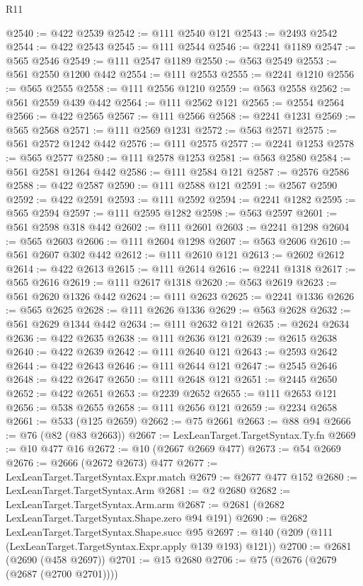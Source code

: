 \begin{lexlean}{R11}
\begin{coremodule}
@2540 := @422 @2539
@2542 := @111 @2540 @121
@2543 := @2493 @2542
@2544 := @422 @2543
@2545 := @111 @2544
@2546 := @2241 @1189
@2547 := @565 @2546
@2549 := @111 @2547 @1189
@2550 := @563 @2549
@2553 := @561 @2550 @1200 @442
@2554 := @111 @2553
@2555 := @2241 @1210
@2556 := @565 @2555
@2558 := @111 @2556 @1210
@2559 := @563 @2558
@2562 := @561 @2559 @439 @442
@2564 := @111 @2562 @121
@2565 := @2554 @2564
@2566 := @422 @2565
@2567 := @111 @2566
@2568 := @2241 @1231
@2569 := @565 @2568
@2571 := @111 @2569 @1231
@2572 := @563 @2571
@2575 := @561 @2572 @1242 @442
@2576 := @111 @2575
@2577 := @2241 @1253
@2578 := @565 @2577
@2580 := @111 @2578 @1253
@2581 := @563 @2580
@2584 := @561 @2581 @1264 @442
@2586 := @111 @2584 @121
@2587 := @2576 @2586
@2588 := @422 @2587
@2590 := @111 @2588 @121
@2591 := @2567 @2590
@2592 := @422 @2591
@2593 := @111 @2592
@2594 := @2241 @1282
@2595 := @565 @2594
@2597 := @111 @2595 @1282
@2598 := @563 @2597
@2601 := @561 @2598 @318 @442
@2602 := @111 @2601
@2603 := @2241 @1298
@2604 := @565 @2603
@2606 := @111 @2604 @1298
@2607 := @563 @2606
@2610 := @561 @2607 @302 @442
@2612 := @111 @2610 @121
@2613 := @2602 @2612
@2614 := @422 @2613
@2615 := @111 @2614
@2616 := @2241 @1318
@2617 := @565 @2616
@2619 := @111 @2617 @1318
@2620 := @563 @2619
@2623 := @561 @2620 @1326 @442
@2624 := @111 @2623
@2625 := @2241 @1336
@2626 := @565 @2625
@2628 := @111 @2626 @1336
@2629 := @563 @2628
@2632 := @561 @2629 @1344 @442
@2634 := @111 @2632 @121
@2635 := @2624 @2634
@2636 := @422 @2635
@2638 := @111 @2636 @121
@2639 := @2615 @2638
@2640 := @422 @2639
@2642 := @111 @2640 @121
@2643 := @2593 @2642
@2644 := @422 @2643
@2646 := @111 @2644 @121
@2647 := @2545 @2646
@2648 := @422 @2647
@2650 := @111 @2648 @121
@2651 := @2445 @2650
@2652 := @422 @2651
@2653 := @2239 @2652
@2655 := @111 @2653 @121
@2656 := @538 @2655
@2658 := @111 @2656 @121
@2659 := @2234 @2658
@2661 := @533 (@125 @2659)
@2662 := @75 @2661
@2663 := @88 @94
@2666 := @76 (@82 (@83 @2663))
@2667 := LexLeanTarget.TargetSyntax.Ty.fn
@2669 := @10 @477 @16
@2672 := @10 (@2667 @2669 @477)
@2673 := @54 @2669
@2676 := @2666 (@2672 @2673) @477
@2677 := LexLeanTarget.TargetSyntax.Expr.match
@2679 := @2677 @477 @152
@2680 := LexLeanTarget.TargetSyntax.Arm
@2681 := @2 @2680
@2682 := LexLeanTarget.TargetSyntax.Arm.arm
@2687 := @2681 (@2682 LexLeanTarget.TargetSyntax.Shape.zero @94 @191)
@2690 := @2682 LexLeanTarget.TargetSyntax.Shape.succ @95
@2697 := @140 (@209 (@111 (LexLeanTarget.TargetSyntax.Expr.apply @139 @193) @121))
@2700 := @2681 (@2690 (@458 @2697))
@2701 := @15 @2680
@2706 := @75 (@2676 (@2679 (@2687 (@2700 @2701))))

\end{coremodule}
\end{lexlean}
